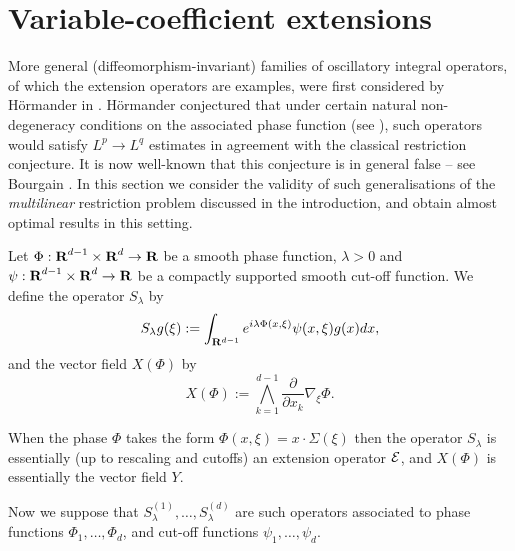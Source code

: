 \section{Variable-coefficient extensions}\label{variable-sec}
More general (diffeomorphism-invariant) families of oscillatory
integral operators, of which the extension operators are examples,
were first considered by H\"ormander in \cite{Hor}. H\"ormander
conjectured that under certain natural non-degeneracy conditions
on the associated phase function (see \cite{St2}), such operators
would satisfy $L^{p} \to L^{q}$ estimates in agreement with the
classical restriction conjecture. It is now well-known that this
conjecture is in general false -- see Bourgain \cite{Bofalse}. In
this section we consider the validity of such
generalisations of the
\textit{multilinear} restriction problem discussed in the
introduction, and obtain almost optimal results in this setting.

Let $\Phi :{\hbox{\bf R}}^{d-1}\times{\hbox{\bf R}}^{d}\rightarrow{\hbox{\bf R}}$ be a smooth phase
function, $\lambda>0$ and $\psi
:{\hbox{\bf R}}^{d-1}\times{\hbox{\bf R}}^{d}\rightarrow{\hbox{\bf R}}$ be a compactly supported
smooth cut-off function. We define the operator $S_{\lambda}$ by
$$
S_{\lambda}g(\xi):=\int_{{\bf
R}^{d-1}}e^{i\lambda\Phi(x,\xi)}\psi(x,\xi)g(x)dx,
$$
and the vector field $X(\Phi)$ by
$$
X(\Phi):=\bigwedge_{k=1}^{d-1}\frac{\partial}{\partial
x_{k}}\nabla_{\xi}\Phi.
$$

\begin{remark} When the phase $\Phi$ takes the form $\Phi(x,\xi) = x \cdot \Sigma(\xi)$
then the operator $S_\lambda$ is essentially (up to rescaling and cutoffs) an extension
operator ${\mathcal{E}}$, and $X(\Phi)$ is essentially the vector field $Y$.
\end{remark}

Now we suppose that $S_{\lambda}^{(1)},\hdots, S_{\lambda}^{(d)}$
are such operators associated to phase functions
$\Phi_{1},\hdots,\Phi_{d}$, and cut-off functions
$\psi_{1},\hdots,\psi_{d}$.

